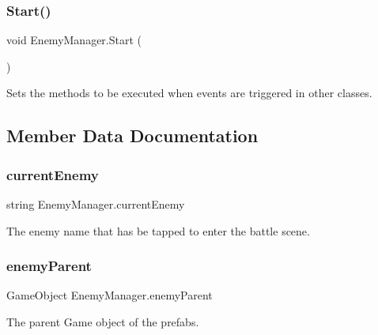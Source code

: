\subsubsection{\texorpdfstring{Start()}{Start()}}
{\footnotesize\ttfamily void Enemy\+Manager.\+Start (\begin{DoxyParamCaption}{ }\end{DoxyParamCaption})\hspace{0.3cm}{\ttfamily [private]}}



Sets the methods to be executed when events are triggered in other classes. 



\subsection{Member Data Documentation}
\mbox{\label{class_enemy_manager_a1cef1d17733d1be85f5c266371566caf}} 
\subsubsection{\texorpdfstring{currentEnemy}{currentEnemy}}
{\footnotesize\ttfamily string Enemy\+Manager.\+current\+Enemy}



The enemy name that has be tapped to enter the battle scene. 

\mbox{\label{class_enemy_manager_a21f4d33210514d104e7a3ee0fe839a59}} 
\subsubsection{\texorpdfstring{enemyParent}{enemyParent}}
{\footnotesize\ttfamily Game\+Object Enemy\+Manager.\+enemy\+Parent}



The parent Game object of the prefabs. 

\mbox{\label{class_enemy_manager_ae75fbb59ff35752dfbf65f6e6ae633a5}} 
